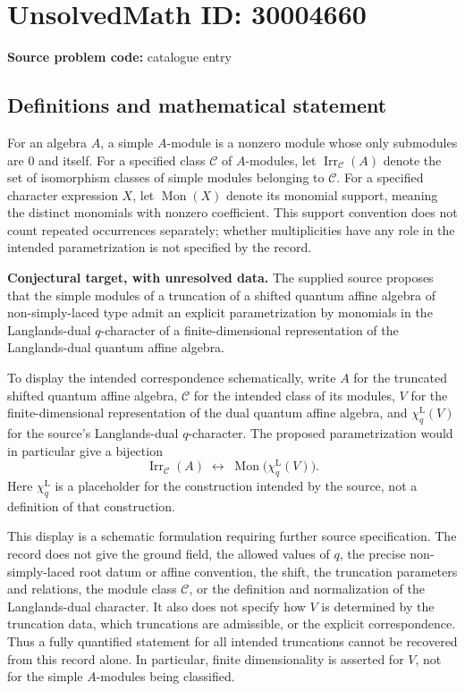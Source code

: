 \documentclass[11pt]{article}
\begin{document}
\section*{UnsolvedMath ID: 30004660}
\textbf{Source problem code:} catalogue entry
\subsection{Definitions and mathematical statement}
For an algebra \(A\), a simple \(A\)-module is a nonzero module whose only submodules are \(0\) and itself. For a specified class \(\mathcal C\) of \(A\)-modules, let \(\operatorname{Irr}_{\mathcal C}(A)\) denote the set of isomorphism classes of simple modules belonging to \(\mathcal C\). For a specified character expression \(X\), let \(\operatorname{Mon}(X)\) denote its monomial support, meaning the distinct monomials with nonzero coefficient. This support convention does not count repeated occurrences separately; whether multiplicities have any role in the intended parametrization is not specified by the record.

\textbf{Conjectural target, with unresolved data.} The supplied source proposes that the simple modules of a truncation of a shifted quantum affine algebra of non-simply-laced type admit an explicit parametrization by monomials in the Langlands-dual \(q\)-character of a finite-dimensional representation of the Langlands-dual quantum affine algebra.

To display the intended correspondence schematically, write \(A\) for the truncated shifted quantum affine algebra, \(\mathcal C\) for the intended class of its modules, \(V\) for the finite-dimensional representation of the dual quantum affine algebra, and \(\chi_q^{\mathrm L}(V)\) for the source's Langlands-dual \(q\)-character. The proposed parametrization would in particular give a bijection
\[
\operatorname{Irr}_{\mathcal C}(A)
\;\longleftrightarrow\;
\operatorname{Mon}\bigl(\chi_q^{\mathrm L}(V)\bigr).
\]
Here \(\chi_q^{\mathrm L}\) is a placeholder for the construction intended by the source, not a definition of that construction.

This display is a schematic formulation requiring further source specification. The record does not give the ground field, the allowed values of \(q\), the precise non-simply-laced root datum or affine convention, the shift, the truncation parameters and relations, the module class \(\mathcal C\), or the definition and normalization of the Langlands-dual character. It also does not specify how \(V\) is determined by the truncation data, which truncations are admissible, or the explicit correspondence. Thus a fully quantified statement for all intended truncations cannot be recovered from this record alone. In particular, finite dimensionality is asserted for \(V\), not for the simple \(A\)-modules being classified.
\end{document}
